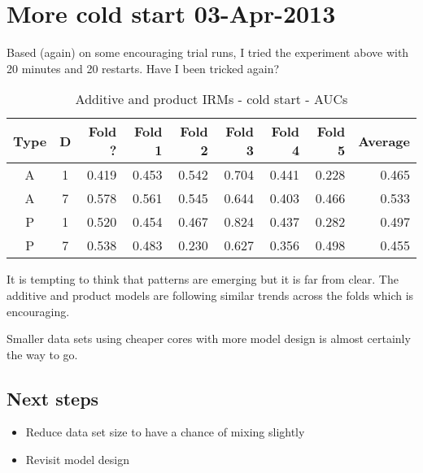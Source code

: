 \documentclass[twoside,11pt]{article}
\begin{document}
\section{More cold start 03-Apr-2013}

Based (again) on some encouraging trial runs, I tried the experiment above with 20 minutes and 20 restarts.
Have I been tricked again?

\begin{table*}[ht!]
\caption{{\small
Additive and product IRMs - cold start - AUCs
}}
\label{tbl:IRM 03-Apr-2013}
\begin{center}
\begin{tabular}{c c | r | r r r r r | r}
Type & D & Fold ? & Fold 1 & Fold 2 & Fold 3 & Fold 4 & Fold 5 & Average \\
\hline
A & 1 & 0.419 & 0.453 & 0.542 & 0.704 & 0.441 & 0.228 & 0.465\\
A & 7 & 0.578 & 0.561 & 0.545 & 0.644 & 0.403 & 0.466 & 0.533\\
P & 1 & 0.520 & 0.454 & 0.467 & 0.824 & 0.437 & 0.282 & 0.497\\
P & 7 & 0.538 & 0.483 & 0.230 & 0.627 & 0.356 & 0.498 & 0.455\\
\end{tabular}
\end{center}
\end{table*}

It is tempting to think that patterns are emerging but it is far from clear.
The additive and product models are following similar trends across the folds which is encouraging.

Smaller data sets using cheaper cores with more model design is almost certainly the way to go.

\subsection{Next steps}

\begin{itemize}
\item Reduce data set size to have a chance of mixing slightly
\item Revisit model design
\end{itemize}

\newpage


\vskip 0.2in

\end{document}
